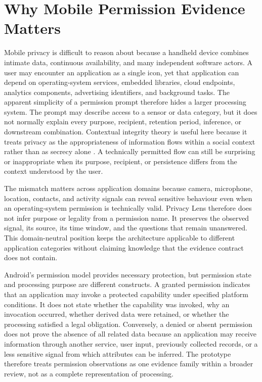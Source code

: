 \section{Why Mobile Permission Evidence Matters}

Mobile privacy is difficult to reason about because a handheld device combines intimate data, continuous availability, and many independent software actors. A user may encounter an application as a single icon, yet that application can depend on operating-system services, embedded libraries, cloud endpoints, analytics components, advertising identifiers, and background tasks. The apparent simplicity of a permission prompt therefore hides a larger processing system. The prompt may describe access to a sensor or data category, but it does not normally explain every purpose, recipient, retention period, inference, or downstream combination. Contextual integrity theory is useful here because it treats privacy as the appropriateness of information flows within a social context rather than as secrecy alone \cite{nissenbaum2011}. A technically permitted flow can still be surprising or inappropriate when its purpose, recipient, or persistence differs from the context understood by the user.

The mismatch matters across application domains because camera, microphone, location, contacts, and activity signals can reveal sensitive behaviour even when an operating-system permission is technically valid. Privacy Lens therefore does not infer purpose or legality from a permission name. It preserves the observed signal, its source, its time window, and the questions that remain unanswered. This domain-neutral position keeps the architecture applicable to different application categories without claiming knowledge that the evidence contract does not contain.

Android's permission model provides necessary protection, but permission state and processing purpose are different constructs. A granted permission indicates that an application may invoke a protected capability under specified platform conditions. It does not state whether the capability was invoked, why an invocation occurred, whether derived data were retained, or whether the processing satisfied a legal obligation. Conversely, a denied or absent permission does not prove the absence of all related data because an application may receive information through another service, user input, previously collected records, or a less sensitive signal from which attributes can be inferred. The prototype therefore treats permission observations as one evidence family within a broader review, not as a complete representation of processing.

